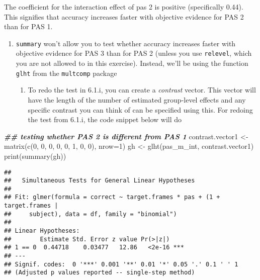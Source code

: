 \documentclass[
]{article}
\newenvironment{Shaded}{\begin{snugshade}}{\end{snugshade}}
\newcommand{\AttributeTok}[1]{\textcolor[rgb]{0.77,0.63,0.00}{#1}}
\newcommand{\DecValTok}[1]{\textcolor[rgb]{0.00,0.00,0.81}{#1}}
\newcommand{\DocumentationTok}[1]{\textcolor[rgb]{0.56,0.35,0.01}{\textbf{\textit{#1}}}}
\newcommand{\FunctionTok}[1]{\textcolor[rgb]{0.00,0.00,0.00}{#1}}
\newcommand{\NormalTok}[1]{#1}
\newcommand{\OtherTok}[1]{\textcolor[rgb]{0.56,0.35,0.01}{#1}}
\providecommand{\tightlist}{%
  \setlength{\itemsep}{0pt}\setlength{\parskip}{0pt}}
\begin{document}
The coefficient for the interaction effect of pas 2 is positive
(specifically 0.44). This signifies that accuracy increases faster with
objective evidence for PAS 2 than for PAS 1.

\begin{enumerate}
\def\labelenumi{\arabic{enumi})}
\setcounter{enumi}{1}
\item
  \texttt{summary} won't allow you to test whether accuracy increases
  faster with objective evidence for PAS 3 than for PAS 2 (unless you
  use \texttt{relevel}, which you are not allowed to in this exercise).
  Instead, we'll be using the function \texttt{glht} from the
  \texttt{multcomp} package

  \begin{enumerate}
  \def\labelenumii{\roman{enumii}.}
  \tightlist
  \item
    To redo the test in 6.1.i, you can create a \emph{contrast} vector.
    This vector will have the length of the number of estimated
    group-level effects and any specific contrast you can think of can
    be specified using this. For redoing the test from 6.1.i, the code
    snippet below will do
  \end{enumerate}
\end{enumerate}

\begin{Shaded}
\begin{Highlighting}[]
\DocumentationTok{\#\# testing whether PAS 2 is different from PAS 1}
\NormalTok{contrast.vector1 }\OtherTok{\textless{}{-}} \FunctionTok{matrix}\NormalTok{(}\FunctionTok{c}\NormalTok{(}\DecValTok{0}\NormalTok{, }\DecValTok{0}\NormalTok{, }\DecValTok{0}\NormalTok{, }\DecValTok{0}\NormalTok{, }\DecValTok{0}\NormalTok{, }\DecValTok{1}\NormalTok{, }\DecValTok{0}\NormalTok{, }\DecValTok{0}\NormalTok{), }\AttributeTok{nrow=}\DecValTok{1}\NormalTok{)}
\NormalTok{gh }\OtherTok{\textless{}{-}} \FunctionTok{glht}\NormalTok{(pas\_m\_int, contrast.vector1)}
\FunctionTok{print}\NormalTok{(}\FunctionTok{summary}\NormalTok{(gh))}
\end{Highlighting}
\end{Shaded}

\begin{verbatim}
## 
##   Simultaneous Tests for General Linear Hypotheses
## 
## Fit: glmer(formula = correct ~ target.frames * pas + (1 + target.frames | 
##     subject), data = df, family = "binomial")
## 
## Linear Hypotheses:
##        Estimate Std. Error z value Pr(>|z|)    
## 1 == 0  0.44718    0.03477   12.86   <2e-16 ***
## ---
## Signif. codes:  0 '***' 0.001 '**' 0.01 '*' 0.05 '.' 0.1 ' ' 1
## (Adjusted p values reported -- single-step method)
\end{verbatim}
\end{document}

